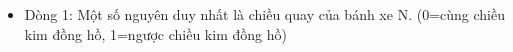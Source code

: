 \begin{itemize}
	\item     Dòng 1: Một số nguyên duy nhất là chiều quay của bánh xe N.         (0=cùng chiều kim đồng hồ, 1=ngược chiều kim đồng hồ)   
\end{itemize}